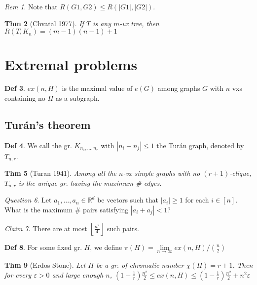 \documentclass[11pt, fleqn, a4paper, landscape]{article}
\theoremstyle{plain} %
\newtheorem{thm}{Thm}
\theoremstyle{remark} %
\newtheorem{rem}[thm]{Rem}
\newtheorem{claim}[thm]{Claim}
\newtheorem{que}[thm]{Question}
\theoremstyle{definition} %
\newtheorem{defi}[thm]{Def}
\begin{document}
\begin{multicols}{5}
\begin{rem}
Note that $R(G1,G2) \le R(|G1|,|G2|)$.
\end{rem}

\begin{thm}[Chvatal 1977]
If $T$ is any $m$-vx tree, then $R(T,K_n) = (m - 1)(n - 1) + 1$
\end{thm}

\section{Extremal problems}
\addtocounter{thm}{1}
\begin{defi}
$ex(n,H)$ is the maximal value of $e(G)$ among graphs $G$ with $n$ vxs containing no $H$ as a subgraph.
\end{defi}
\addtocounter{thm}{1}
\subsection{Turán’s theorem}
\begin{defi}
We call the gr. $K_{n_1,\dots,n_r}$ with $|n_i - n_j|\le 1$ the Turán graph, denoted by $T_{n,r}$.
\end{defi}

\begin{thm}[Turan 1941]
Among all the $n$-vx simple graphs with no $(r + 1)$-clique, $T_{n,r}$ is
the unique gr. having the maximum \# edges.
\end{thm} 

\begin{que}
Let $a_1, \dots , a_n \in \mathbb{R}^d$ be vectors such that $|a_i|\ge 1$ for each $i \in [n]$. What is the maximum \# pairs satisfying $|a_i + a_j| < 1$?
\end{que}

\begin{claim}
There are at most $\left\lfloor \frac{n^2}{4}\right\rfloor$ such pairs.
\end{claim}

\begin{defi}
For some fixed gr. $H$, we define $\pi(H) = \lim\limits_{n\to\infty} ex(n,H)/\binom{n}{2}$
\end{defi}

\begin{thm}[Erdos-Stone]
Let $H$ be a gr. of chromatic number $\chi(H) = r + 1$. Then for
every $\varepsilon > 0$ and large enough $n$, $\left(1-\frac{1}{r}\right)\frac{n^2}{2}\le ex(n,H)\le\left(1-\frac{1}{r}\right)\frac{n^2}{2}+n^2\varepsilon$
\end{thm}
 \addtocounter{thm}{1}

\end{multicols}
\end{document}
